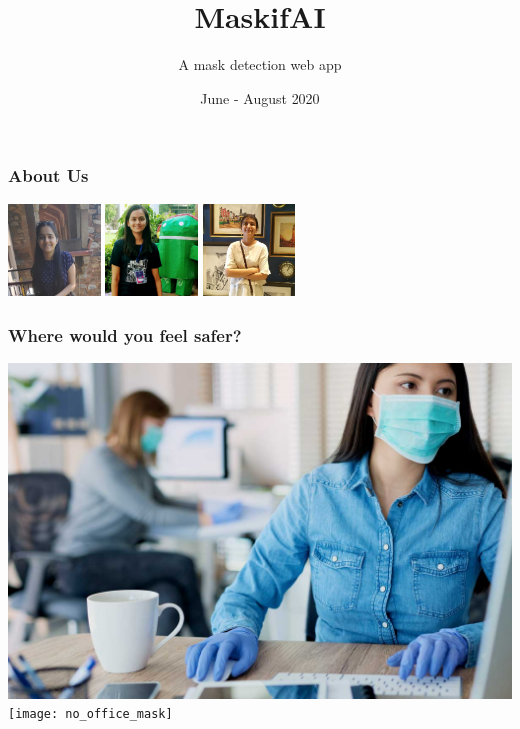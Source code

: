 \documentclass[14pt]{beamer}
\title{MaskifAI}
\subtitle{A mask detection web app}
\author[WTEF Project]{}
\date{June - August 2020}
\begin{document}
\begin{frame}
    \titlepage
\end{frame}


\begin{frame}
    \frametitle{About Us}
    \hfil\hfil\includegraphics[width=2.45cm]{SachitaMalhotra}\newline
    \null\hfil\hfil{}\newline
    \vfil
    \hfil\hfil\includegraphics[width=2.45cm]{ShruthiRao}\hfil\hfil
        \includegraphics[width=2.45cm]{SrishtiNegi}\newline
    \null\hfil\hfil{}
    \hfil\hfil{}
\end{frame}

\begin{frame}
    \frametitle{Where would you feel safer?}
    \centering
    \includegraphics[width=4.5 cm,height=3.5 cm]{office_mask}
    \texttt{[image: no\_office\_mask]}
\end{frame}
\end{document}
